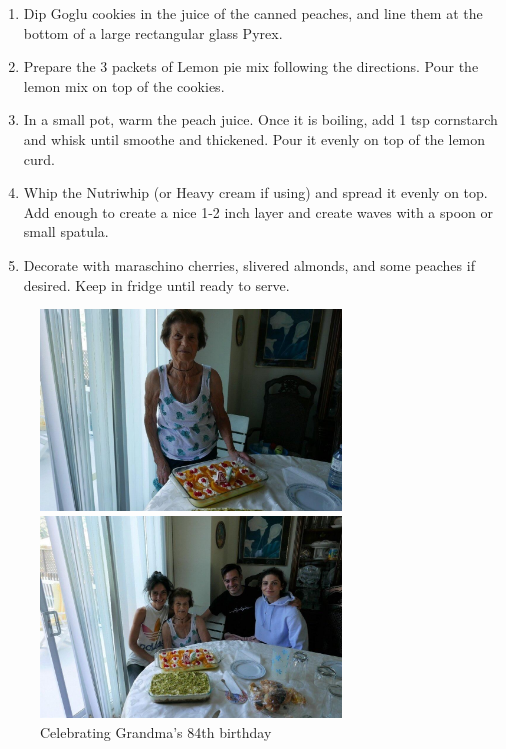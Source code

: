 \begin{enumerate}
    \item Dip Goglu cookies in the juice of the canned peaches, and line them at the bottom of a large rectangular glass Pyrex.
    \item Prepare the 3 packets of Lemon pie mix following the directions. Pour the lemon mix on top of the cookies.
    \item In a small pot, warm the peach juice. Once it is boiling, add 1 tsp cornstarch and whisk until smoothe and thickened. Pour it evenly on top of the lemon curd.
    \item Whip the Nutriwhip (or Heavy cream if using) and spread it evenly on top. Add enough to create a nice 1-2 inch layer and create waves with a spoon or small spatula. 
    \item Decorate with maraschino cherries, slivered almonds, and some peaches if desired. Keep in fridge until ready to serve.
\end{enumerate}

\begin{figure}
  \includegraphics[width=80mm]{monanteras/images/Lemon cake.jpg}
    \caption{Celebrating Grandma's 84th birthday}
  \includegraphics[width=80mm]{monanteras/images/Lemon cake 2.jpg}
\end{figure}
